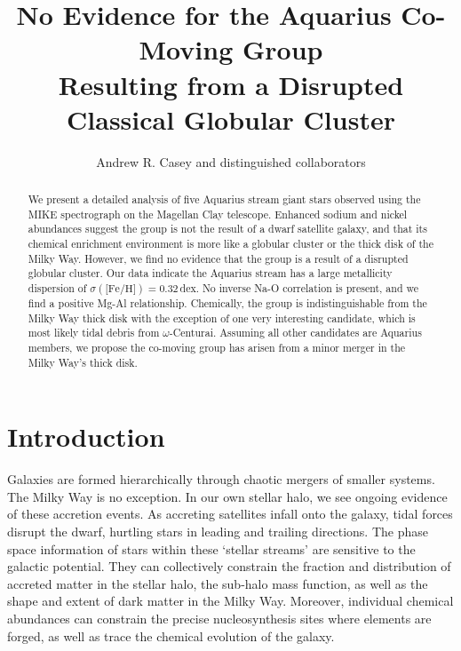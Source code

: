 \documentclass{emulateapj}
\begin{document}
\title{No Evidence for the Aquarius Co-Moving Group \\Resulting from a Disrupted Classical Globular Cluster}


\author{Andrew R. Casey and distinguished collaborators}


\begin{abstract}
We present a detailed analysis of five Aquarius stream giant stars observed using the MIKE spectrograph on the Magellan Clay telescope.  Enhanced sodium and nickel abundances suggest the group is not the result of a dwarf satellite galaxy, and that its chemical enrichment environment is more like a globular cluster or the thick disk of the Milky Way. However, we find no evidence that the group is a result of a disrupted globular cluster. Our data indicate the Aquarius stream has a large metallicity dispersion of $\sigma(\mbox{[Fe/H}]) = 0.32$\,dex. No inverse Na-O correlation is present, and we find a positive Mg-Al relationship. Chemically, the group is indistinguishable from the Milky Way thick disk with the exception of one very interesting candidate, which is most likely tidal debris from $\omega$-Centurai. Assuming all other candidates are Aquarius members, we propose the co-moving group has arisen from a minor merger in the Milky Way's thick disk.

\end{abstract}


\section{Introduction}
Galaxies are formed hierarchically through chaotic mergers of smaller systems. The Milky Way is no exception. In our own stellar halo, we see ongoing evidence of these accretion events. As accreting satellites infall onto the galaxy, tidal forces disrupt the dwarf, hurtling stars in leading and trailing directions. The phase space information of stars within these `stellar streams' are sensitive to the galactic potential. They can collectively constrain the fraction and distribution of accreted matter in the stellar halo, the sub-halo mass function, as well as the shape and extent of dark matter in the Milky Way. Moreover, individual chemical abundances can constrain the  precise nucleosynthesis sites where elements are forged, as well as trace the chemical evolution of the galaxy.
\end{document}
